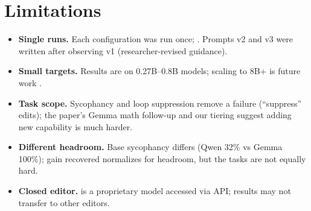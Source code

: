\section{Limitations}
\label{sec:limitations}

\begin{itemize}[leftmargin=*,itemsep=2pt]
  \item \textbf{Single runs.} Each configuration was run once; . Prompts v2 and v3 were written after
        observing v1 (researcher-revised guidance).
  \item \textbf{Small targets.} Results are on 0.27B--0.8B models; scaling to 8B+ is future work .
  \item \textbf{Task scope.} Sycophancy and loop suppression remove a failure (``suppress'' edits); the paper's
        Gemma math follow-up and our tiering suggest adding new capability is much harder.
  \item \textbf{Different headroom.} Base sycophancy differs (Qwen 32\% vs Gemma 100\%); gain recovered normalizes
        for headroom, but the tasks are not equally hard.
  \item \textbf{Closed editor.} \astra{} is a proprietary model accessed via API; results may not transfer to other
        editors. 
\end{itemize}
